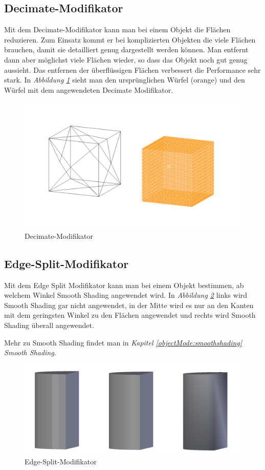 \subsection{Decimate-Modifikator}
\label{Decimate:heading}
Mit dem Decimate-Modifikator kann man bei einem Objekt die Flächen reduzieren.\citep{blender:decimate_modifier} Zum Einsatz kommt er bei komplizierten
Objekten die viele Flächen brauchen, damit sie detailliert genug dargestellt werden können. Man entfernt dann aber möglichst viele Flächen
wieder, so dass das Objekt noch gut genug aussieht. Das entfernen der überflüssigen Flächen verbessert die Performance sehr stark.
In \textit{Abbildung \ref{modifikatoren:image6}} sieht man den ursprünglichen Würfel (orange) und den Würfel mit dem angewendeten
Decimate Modifikator.
\begin{figure}[H]
    \centering
    \includegraphics[width=.8\textwidth]{images/Modifikatoren-Decimate.png}
    \caption{Decimate-Modifikator}
    \label{modifikatoren:image6}
\end{figure}

\subsection{Edge-Split-Modifikator}
\label{Edge_Split:heading}
Mit dem Edge Split Modifikator kann man bei einem Objekt bestimmen, ab welchem Winkel Smooth Shading angewendet wird.\citep{blender:edgesplit_modifier}
In \textit{Abbildung \ref{modifikatoren:image7}} links wird Smooth Shading gar nicht angewendet, in der Mitte wird es nur an
den Kanten mit dem geringsten Winkel zu den Flächen angewendet und rechts wird Smooth Shading überall angewendet.

Mehr zu Smooth Shading findet man in \textit{Kapitel \ref{objectMode:smoothshading} \dq Smooth Shading\dq}.
\begin{figure}[H]
    \centering
    \includegraphics[width=.8\textwidth]{images/Modifikatoren-Edgesplit.png}
    \caption{Edge-Split-Modifikator}
    \label{modifikatoren:image7}
\end{figure}
\flushbottom